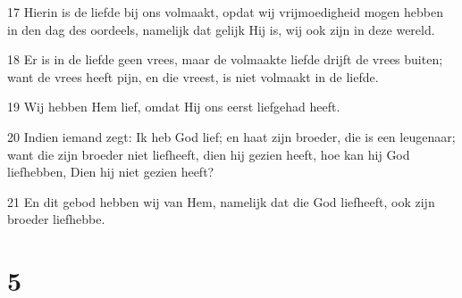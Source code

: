 \par 17 Hierin is de liefde bij ons volmaakt, opdat wij vrijmoedigheid mogen hebben in den dag des oordeels, namelijk dat gelijk Hij is, wij ook zijn in deze wereld.
\par 18 Er is in de liefde geen vrees, maar de volmaakte liefde drijft de vrees buiten; want de vrees heeft pijn, en die vreest, is niet volmaakt in de liefde.
\par 19 Wij hebben Hem lief, omdat Hij ons eerst liefgehad heeft.
\par 20 Indien iemand zegt: Ik heb God lief; en haat zijn broeder, die is een leugenaar; want die zijn broeder niet liefheeft, dien hij gezien heeft, hoe kan hij God liefhebben, Dien hij niet gezien heeft?
\par 21 En dit gebod hebben wij van Hem, namelijk dat die God liefheeft, ook zijn broeder liefhebbe.

\chapter{5}

